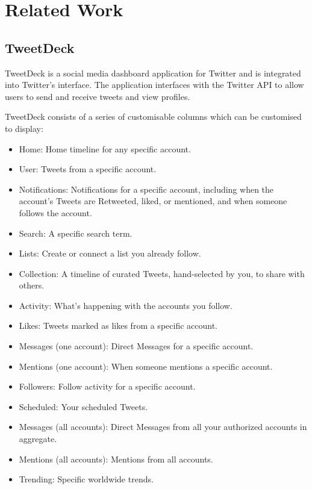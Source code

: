 \documentclass[chapterprefix=false]{scrreprt}
\begin{document}
\newpage

\section{Related Work}

\subsection{TweetDeck}

TweetDeck is a social media dashboard application for Twitter and is integrated into Twitter’s interface. The application interfaces with the Twitter API to allow users to send and receive tweets and view profiles\cite{tweetdeck}. 

TweetDeck consists of a series of customisable columns which can be customised to display:

\begin{itemize}
 \setlength\itemsep{-0.75em}
 \item Home: Home timeline for any specific account.
 \item User: Tweets from a specific account.
 \item Notifications: Notifications for a specific account, including when the account's Tweets are Retweeted, liked, or mentioned, and when someone follows the account.
 \item Search: A specific search term.
 \item Lists: Create or connect a list you already follow.
 \item Collection: A timeline of curated Tweets, hand-selected by you, to share with others.
 \item Activity: What’s happening with the accounts you follow.
 \item Likes: Tweets marked as likes from a specific account.
 \item Messages (one account): Direct Messages for a specific account.
 \item Mentions (one account): When someone mentions a specific account.
 \item Followers: Follow activity for a specific account.
 \item Scheduled: Your scheduled Tweets.
 \item Messages (all accounts): Direct Messages from all your authorized accounts in aggregate.
 \item Mentions (all accounts): Mentions from all accounts.
 \item Trending: Specific worldwide trends.
\end{itemize}
\end{document}
